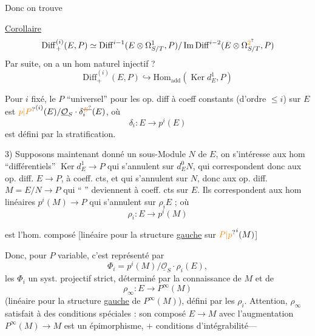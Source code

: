 Donc on trouve

\uline{Corollaire}
\[
 \mathrm{Diff}^{(i)}_+(E,P)\simeq
 \mathrm{Diff}^{i-1}(E\otimes\Omega^1_{S/T},P)/
 \operatorname{Im}\mathrm{Diff}^{i-2}(E\otimes\Omega^{\unsure{2}}_{S/T},P)
\]
Par suite, on a un hom naturel injectif \textcircled{?}
\[
 \mathrm{Diff}^{(i)}_+(E,P)\hookrightarrow
 \mathrm{Hom}_{\mathrm{add}}(\operatorname{Ker}d_E^1,P)
\]

Pour $i$ fixé, le $P$ ``universel'' pour les op. diff à coeff constants (d'ordre $\leq i$) sur $E$ est $\unsure{p|P}^{(i)}(E)/\underline{\mathcal O}_S\cdot\delta_i^{\deleted{\unsure{E}}}(E)$, où
\[
 \delta_i:E\longrightarrow p^i(E)
\]
est défini par la stratification.

3) Supposons maintenant donné un sous-Module $N$ de $E$, on s'intéresse aux hom ``différentiels'' $\operatorname{Ker}d_E^1\longrightarrow P$ qui s'annulent sur $d_E^0 N$, qui correspondent donc aux  op. diff. $E\longrightarrow P$, à coeff. cts, et qui s'annulent sur $N$, donc aux op. diff. $M=E/N\longrightarrow P$ qui `` '' deviennent à coeff. cts sur $E$. Ils correspondent  aux hom linéaires $p^i(M)\longrightarrow P$ qui s'annulent sur $\rho_i E$ ; où
\[
 \rho_i:E\longrightarrow p^i(M)
\]

est l'hom. composé [linéaire pour la structure \uline{gauche} sur $\unsure{P|p}^{i}(M)$]

Donc, pour $P$ variable, c'est représenté par
\[
 \Phi_i=p^i(M)/\underline{\mathcal O}_S\cdot\rho_i(E),
\]
les $\Phi_i$  un syst. projectif strict, déterminé par la connaissance de $M$ et de
\[
 \rho_\infty:E\longrightarrow P^\infty(M)
\]
(linéaire pour la structure \uline{gauche} de $P^\infty(M)$), défini par les $\rho_i$. Attention,  $\rho_\infty$ satisfait à des  conditions spéciales : son composé $E\longrightarrow M$ avec l'augmentation $P^\infty(M)\longrightarrow M$ est un épimorphisme, $+$ conditions d'intégrabilité---


